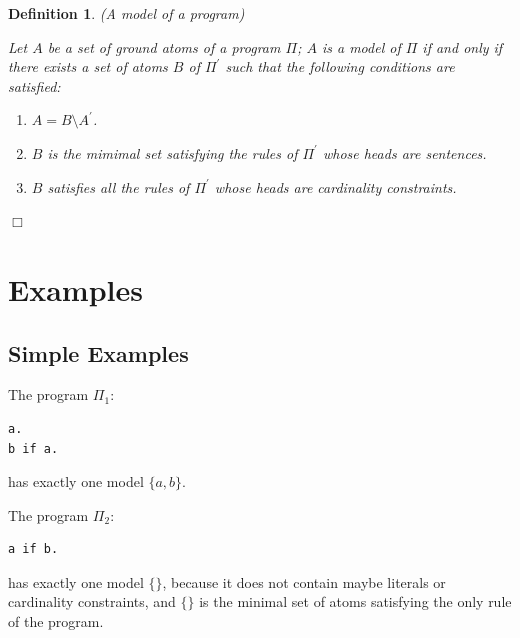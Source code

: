 \documentclass[a4paper,10pt]{article}
\newtheorem{definition}{Definition}
\providecommand{\DIFaddbegin}{} %
\providecommand{\DIFaddend}{} %
\providecommand{\DIFdelbegin}{} %
\providecommand{\DIFdelend}{} %
\begin{document}
\DIFaddend \begin{definition}(A model of a program)\\
\DIFdelbegin %
\DIFdelend \DIFaddbegin \rm{
Let $A$ be a set of ground atoms of a program $\Pi$; $A$ is a model of $\Pi$ if and only if 
there exists a set of atoms $B$ of $\Pi^\prime$ such that  the following conditions are satisfied:
\begin{enumerate}
\item $A = B \setminus A^\prime$.
\item $B$ is the mimimal set satisfying the rules of $\Pi^\prime$ whose heads are sentences.
\item $B$ satisfies all the rules of $\Pi^\prime$ whose heads are cardinality constraints.
\end{enumerate}
}
\DIFaddend \hfill$\Box$
\end{definition}

\section{Examples}

\subsection{Simple Examples} 

The program $\Pi_1$:
\begin{verbatim}
a.
b if a.
\end{verbatim}
has exactly one model $\{a,b\}$.

\medskip\noindent
The program $\Pi_2$:
\begin{verbatim}
a if b.
\end{verbatim}
has exactly one model $\{\}$, because it  does not contain maybe literals or cardinality constraints, and $\{\}$ is the minimal set of atoms satisfying the only rule of the program.
\end{document}
